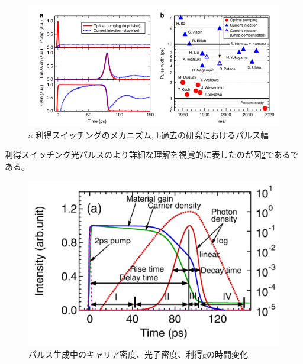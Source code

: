 \begin{figure}[h]
	\centering
	\includegraphics[width=15cm]{figure/fig_1_1_GS_ito.png}
	\caption{a 利得スイッチングのメカニズム, b過去の研究におけるパルス幅\cite{ref_t_ito}}
	\label{fig:fig_1_1_GS_ito}
\end{figure}

\newpage
利得スイッチング光パルスのより詳細な理解を視覚的に表したのが図\ref{fig:fig_1_1_GS_pulse}である\cite{ref_1_1_GS}である。
\begin{figure}[ht]
	\centering
	\includegraphics[width=15cm]{figure/fig_1_1_GS_pulse.png}
	\caption{パルス生成中のキャリア密度、光子密度、利得gの時間変化\cite{ref_1_1_GS}}
	\label{fig:fig_1_1_GS_pulse}
\end{figure}

